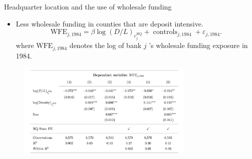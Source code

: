 \documentclass[notes,10pt, aspectratio=169]{beamer}
\begin{document}
    
            \begin{frame}{Headquarter location and the use of wholesale funding         \hyperlink{mismatch_sorting}{}}\label{mismatch_sorting2}
        \begin{itemize}
            \item Less wholesale funding in counties that are deposit intensive.
            $$
            \mathrm{WFE}_{j, 1984}=\beta \log (D / L)_{c_j^{H Q}}+\operatorname{controls}_{j, 1984}+\varepsilon_{j, 1984} .
            $$
            where $\mathrm{WFE}_{j, 1984}$ denotes the log of bank $j$ 's wholesale funding exposure in 1984. %
        \end{itemize}
    
        
        \begin{figure}
            \centering
            \includegraphics[width=0.75\textwidth]{imgs/tab5.png}
            \label{fig:my_label}
        \end{figure}
        
        \end{frame}
    
    
    
\end{document}
